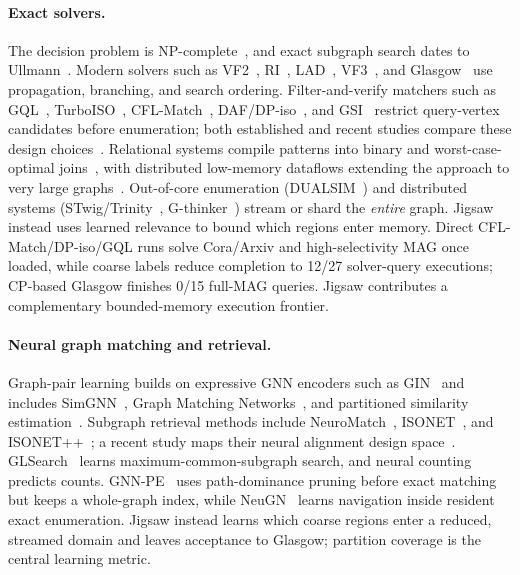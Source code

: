 \documentclass[runningheads]{llncs}
\begin{document}
\paragraph{Exact solvers.}
The decision problem is NP-complete~\cite{ref_garey}, and exact subgraph search dates to Ullmann~\cite{ref_ullmann}. Modern solvers such as VF2~\cite{ref_vf2}, RI~\cite{ref_ri}, LAD~\cite{ref_lad}, VF3~\cite{ref_vf3}, and Glasgow~\cite{ref_glasgow} use propagation, branching, and search ordering. Filter-and-verify matchers such as GQL~\cite{ref_graphql}, TurboISO~\cite{ref_turboiso}, CFL-Match~\cite{ref_cflmatch}, DAF/DP-iso~\cite{ref_daf}, and GSI~\cite{ref_gsi} restrict query-vertex candidates before enumeration; both established and recent studies compare these design choices~\cite{ref_survey,ref_survey2024}. Relational systems compile patterns into binary and worst-case-optimal joins~\cite{ref_wcoj}, with distributed low-memory dataflows extending the approach to very large graphs~\cite{ref_lowmem}. Out-of-core enumeration (DUALSIM~\cite{ref_dualsim}) and distributed systems (STwig/Trinity~\cite{ref_trinity}, G-thinker~\cite{ref_gthinker}) stream or shard the \emph{entire} graph. Jigsaw instead uses learned relevance to bound which regions enter memory. Direct CFL-Match/DP-iso/GQL runs solve Cora/Arxiv and high-selectivity MAG once loaded, while coarse labels reduce completion to 12/27 solver-query executions; CP-based Glasgow finishes 0/15 full-MAG queries. Jigsaw contributes a complementary bounded-memory execution frontier.

\paragraph{Neural graph matching and retrieval.}
Graph-pair learning builds on expressive GNN encoders such as GIN~\cite{ref_gin} and includes SimGNN~\cite{ref_simgnn}, Graph Matching Networks~\cite{ref_gmn}, and partitioned similarity estimation~\cite{ref_psimgnn}. Subgraph retrieval methods include NeuroMatch~\cite{ref_neuromatch}, ISONET~\cite{ref_isonet}, and ISONET++~\cite{ref_isonetpp}; a recent study maps their neural alignment design space~\cite{ref_neuraldesign}. GLSearch~\cite{ref_glsearch} learns maximum-common-subgraph search, and neural counting~\cite{ref_nsic} predicts counts. GNN-PE~\cite{ref_gnnpe} uses path-dominance pruning before exact matching but keeps a whole-graph index, while NeuGN~\cite{ref_neugn} learns navigation inside resident exact enumeration. Jigsaw instead learns which coarse regions enter a reduced, streamed domain and leaves acceptance to Glasgow; partition coverage is the central learning metric.
\end{document}
